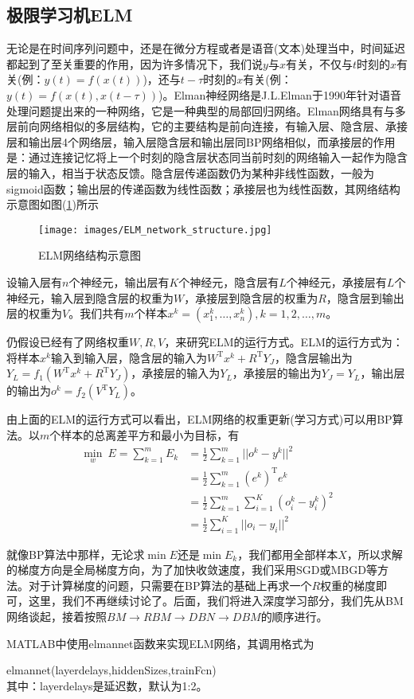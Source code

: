     \subsection{极限学习机ELM}
        \par
        无论是在时间序列问题中，还是在微分方程或者是语音(文本)处理当中，时间延迟都起到了至关重要的作用，因为许多情况下，我们说$y$与$x$有关，不仅与$t$时刻的$x$有关(例：$y(t) = f(x(t))$)，还与$t-\tau$时刻的$x$有关(例：$y(t) = f(x(t),x(t-\tau))$)。Elman神经网络是J.L.Elman于1990年针对语音处理问题提出来的一种网络，它是一种典型的局部回归网络。Elman网络具有与多层前向网络相似的多层结构，它的主要结构是前向连接，有输入层、隐含层、承接层和输出层4个网络层，输入层隐含层和输出层同BP网络相似，而承接层的作用是：通过连接记忆将上一个时刻的隐含层状态同当前时刻的网络输入一起作为隐含层的输入，相当于状态反馈。隐含层传递函数仍为某种非线性函数，一般为sigmoid函数；输出层的传递函数为线性函数；承接层也为线性函数，其网络结构示意图如图(\ref{fig:ELM网络结构示意图})所示
            \begin{figure}[H]
            \centering
            \texttt{[image: images/ELM\_network\_structure.jpg]}
            \caption{ELM网络结构示意图}
            \label{fig:ELM网络结构示意图}
            \end{figure}
        设输入层有$n$个神经元，输出层有$K$个神经元，隐含层有$L$个神经元，承接层有$L$个神经元，输入层到隐含层的权重为$W$，承接层到隐含层的权重为$R$，隐含层到输出层的权重为$V$。我们共有$m$个样本$x^k = (x_1^k,\dots,x_n^k),k=1,2,\dots,m$。
        \par
        仍假设已经有了网络权重$W,R,V$，来研究ELM的运行方式。ELM的运行方式为：将样本$x^k$输入到输入层，隐含层的输入为$W^\mathrm{T}x^k+ R^\mathrm{T}Y_J$，隐含层输出为$Y_L= f_1(W^\mathrm{T}x^k+R^\mathrm{T}Y_J)$，承接层的输入为$Y_L$，承接层的输出为$Y_J = Y_L$，输出层的输出为$o^k = f_2(V^\mathrm{T}Y_L)$。
        \par
        由上面的ELM的运行方式可以看出，ELM网络的权重更新(学习方式)可以用BP算法。以$m$个样本的总离差平方和最小为目标，有
        \begin{align*}
        \min_w \ E = \sum_{k=1}^m E_k & = \frac{1}{2} \sum_{k=1}^m||o^k-y^k||^2\\
        & = \frac{1}{2} \sum_{k=1}^m (e^k)^\mathrm{T}e^k\\
        & =\frac{1}{2} \sum_{k=1}^m \sum_{i=1}^K (o_i^k - y_i^k)^2\\
        & =\frac{1}{2} \sum_{i=1}^K||o_i-y_i||^2
        \end{align*}
        \par
        就像BP算法中那样，无论求$\min E$还是$\min E_k$，我们都用全部样本$X$，所以求解的梯度方向是全局梯度方向，为了加快收敛速度，我们采用SGD或MBGD等方法。对于计算梯度的问题，只需要在BP算法的基础上再求一个$R$权重的梯度即可，这里，我们不再继续讨论了。后面，我们将进入深度学习部分，我们先从BM网络谈起，接着按照$BM\to RBM\to DBN\to DBM$的顺序进行。
        \par
        MATLAB中使用elmannet函数来实现ELM网络，其调用格式为
        \par
        elmannet(layerdelays,hiddenSizes,trainFcn)\\
        其中：layerdelays是延迟数，默认为1:2。

